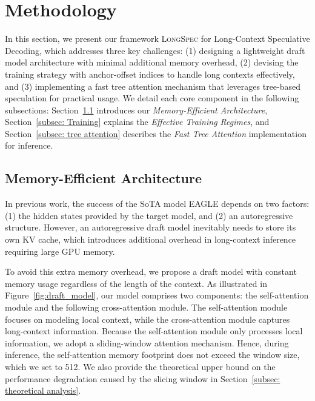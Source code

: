 \vspace{-.2cm}
\section{Methodology}

In this section, we present our framework \textsc{LongSpec} for Long-Context Speculative Decoding, which addresses three key challenges:
(1) designing a lightweight draft model architecture with minimal additional memory overhead,
(2) devising the training strategy with anchor-offset indices to handle long contexts effectively,
and (3) implementing a fast tree attention mechanism that leverages tree-based speculation for practical usage.
We detail each core component in the following subsections:
Section~\ref{subsec: arch} introduces our \emph{Memory-Efficient Architecture},
Section~\ref{subsec: Training} explains the \emph{Effective Training Regimes},
and Section~\ref{subsec: tree attention} describes the \emph{Fast Tree Attention} implementation for  inference.

\subsection{Memory-Efficient Architecture}
\label{subsec: arch}
In previous work, the success of the SoTA model EAGLE depends on two factors: (1) the hidden states provided by the target model, and (2) an autoregressive structure. However, an autoregressive draft model inevitably needs to store its own KV cache, which introduces additional overhead in long-context inference requiring large GPU memory. 

To avoid this extra memory overhead, we propose a draft model with constant memory usage regardless of the length of the context. 
As illustrated in Figure~\ref{fig:draft_model}, our model comprises two components: the self-attention module and the following cross-attention module. The self-attention module focuses on modeling local context, while the cross-attention module captures long-context information. 
Because the self-attention module only processes local information, we adopt a sliding-window attention mechanism. Hence, during inference, the self-attention memory footprint does not exceed the window size, which we set to 512. We also provide the theoretical upper bound on the performance degradation caused by the slicing window in Section~\ref{subsec: theoretical analysis}.

